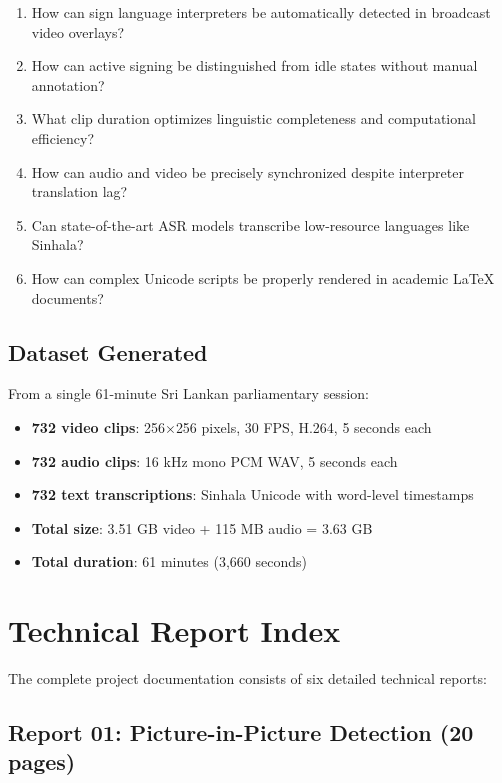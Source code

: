 \documentclass[11pt,a4paper]{article}
\begin{document}
\begin{enumerate}
    \item How can sign language interpreters be automatically detected in broadcast video overlays?
    \item How can active signing be distinguished from idle states without manual annotation?
    \item What clip duration optimizes linguistic completeness and computational efficiency?
    \item How can audio and video be precisely synchronized despite interpreter translation lag?
    \item Can state-of-the-art ASR models transcribe low-resource languages like Sinhala?
    \item How can complex Unicode scripts be properly rendered in academic LaTeX documents?
\end{enumerate}

\subsection{Dataset Generated}

From a single 61-minute Sri Lankan parliamentary session:
\begin{itemize}
    \item \textbf{732 video clips}: 256$\times$256 pixels, 30 FPS, H.264, 5 seconds each
    \item \textbf{732 audio clips}: 16 kHz mono PCM WAV, 5 seconds each
    \item \textbf{732 text transcriptions}: Sinhala Unicode with word-level timestamps
    \item \textbf{Total size}: 3.51 GB video + 115 MB audio = 3.63 GB
    \item \textbf{Total duration}: 61 minutes (3,660 seconds)
\end{itemize}

\section{Technical Report Index}

The complete project documentation consists of six detailed technical reports:

\subsection{Report 01: Picture-in-Picture Detection (20 pages)}
\end{document}
